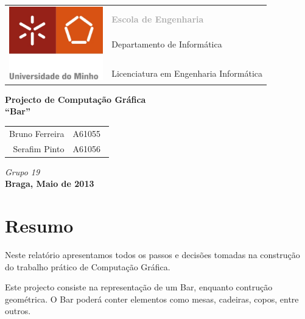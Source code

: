 \documentclass[a5paper,onecolumn, 11pt]{article}
\begin{document}
\onecolumn
\thispagestyle{empty}
\begin{tabular}{ll}
    \multirow{7}{*}{ \includegraphics[height=90pt]{logo.jpeg} }
    &\\
    & \textcolor{DarkGray}{\Large{\textbf{Escola de Engenharia}}} \\
    &\\
    & \large{Departamento de Informática}\\
    &\\
    &\\
    & \large{Licenciatura em Engenharia Informática}\\
\end{tabular}
\begin{center}
    \Large{\textbf{Projecto de Computação Gráfica}}\\
    \vspace{20pt}
    \Large{\textbf{``Bar''}}\\
    \vspace{15pt}
    \begin{tabular}{r@{, }l}
        Bruno Ferreira&A61055\\
        Serafim Pinto&A61056\
    \end{tabular}
    
    \vspace{5pt}
    \emph{Grupo 19}\\\vspace{15pt}
    \large{\textbf{Braga, Maio de 2013}}
\end{center}

\newpage
\onecolumn
\tableofcontents
\newpage
\listoffigures

\newpage
\section{Resumo}
Neste relatório apresentamos todos os passos e decisões tomadas na construção do trabalho prático de Computação Gráfica.

Este projecto consiste na representação de um Bar, enquanto contrução geométrica. O Bar poderá conter elementos como mesas, cadeiras, copos, entre outros.
\end{document}
